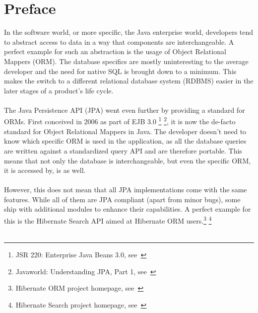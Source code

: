 
\section{Preface}\label{Preface}
In the software world, or more specific, the Java enterprise world, developers tend to abstract access to data in a way that components are interchangeable. A perfect example for such an abstraction is the usage of Object Relational Mappers (ORM). The database specifics are mostly uninteresting to the average developer and the need for native SQL is brought down to a minimum. This makes the switch to a different relational database system (RDBMS) easier in the later stages of a product's life cycle.
\\\\
The Java Persistence API (JPA) went even further by providing a standard for ORMs. First conceived in 2006 as part of EJB 3.0 \footnote{JSR 220: Enterprise Java Beans 3.0, see~\cite{jsr_jpa1}} \footnote{Javaworld: Understanding JPA, Part 1, see~\cite{javaworld_jpa1}}, it is now the de-facto standard for Object Relational Mappers in Java. The developer doesn't need to know which specific ORM is used in the application, as all the database queries are written against a standardized query API and are therefore portable. This means that not only the database is interchangeable, but even the specific ORM, it is accessed by, is as well.
\\\\
However, this does not mean that all JPA implementations come with the same features. While all of them are JPA compliant (apart from minor bugs), some ship with additional modules to enhance their capabilities. A perfect example for this is the Hibernate Search API aimed at Hibernate ORM users.\footnote{Hibernate ORM project homepage, see~\cite{hibernate_orm}} \footnote{Hibernate Search project homepage, see~\cite{hibernate_search_homepage}}
\\\\

